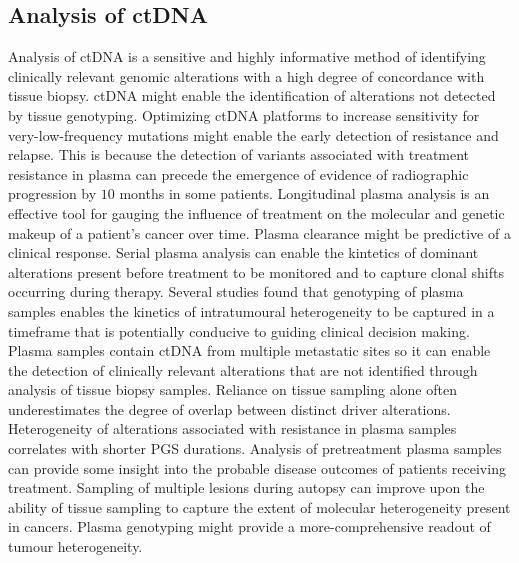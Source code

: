 	\subsection{Analysis of ctDNA}
	Analysis of ctDNA is a sensitive and highly informative method of identifying clinically relevant genomic alterations with a high degree of concordance with tissue biopsy.
	ctDNA might enable the identification of alterations not detected by tissue genotyping.
	Optimizing ctDNA platforms to increase sensitivity for very-low-frequency mutations might enable the early detection of resistance and relapse.
	This is because the detection of variants associated with treatment resistance in plasma can precede the emergence of evidence of radiographic progression by $10$ months in some patients.
	Longitudinal plasma analysis is an effective tool for gauging the influence of treatment on the molecular and genetic makeup of a patient's cancer over time.
	Plasma clearance might be predictive of a clinical response.
	Serial plasma analysis can enable the kintetics of dominant alterations present before treatment to be monitored and to capture clonal shifts occurring during therapy.
	Several studies found that genotyping of plasma samples enables the kinetics of intratumoural heterogeneity to be captured in a timeframe that is potentially conducive to guiding clinical decision making.
	Plasma samples contain ctDNA from multiple metastatic sites so it can enable the detection of clinically relevant alterations that are not identified through analysis of tissue biopsy samples.
	Reliance on tissue sampling alone often underestimates the degree of overlap between distinct driver alterations.
	Heterogeneity of alterations associated with resistance in plasma samples correlates with shorter PGS durations.
	Analysis of pretreatment plasma samples can provide some insight into the probable disease outcomes of patients receiving treatment.
	Sampling of multiple lesions during autopsy can improve upon the ability of tissue sampling to capture the extent of molecular heterogeneity present in cancers.
	Plasma genotyping might provide a more-comprehensive readout of tumour heterogeneity.

